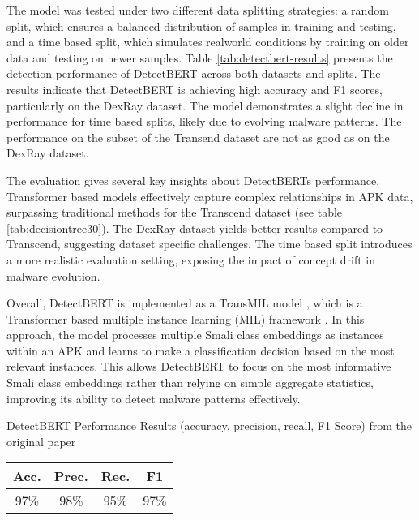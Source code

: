 The model was tested under two different data splitting strategies: a random split, 
which ensures a balanced distribution of samples in training and testing, 
and a time based split, which simulates realworld conditions by training on older 
data and testing on newer samples. 
Table \ref{tab:detectbert-results} presents the detection performance of DetectBERT across both datasets 
and splits. The results indicate that DetectBERT is
achieving high accuracy and F1 scores, particularly on the DexRay dataset. 
The model demonstrates a slight decline in performance for time based splits, 
likely due to evolving malware patterns. 
The performance on the subset of the Transend dataset are not as good as 
on the DexRay dataset.

The evaluation gives several key insights about DetectBERTs performance. 
Transformer based models effectively capture complex relationships in APK data, 
surpassing traditional methods for the Transcend dataset (see table \ref{tab:decisiontree30}). 
The DexRay dataset yields better results compared 
to Transcend, suggesting dataset specific challenges. 
The time based split introduces a more realistic evaluation setting, 
exposing the impact of concept drift in malware evolution.

Overall, DetectBERT is implemented as a TransMIL model , which is a Transformer based 
multiple instance learning (MIL) framework \cite{transmil}. 
In this approach, the model processes 
multiple Smali class embeddings as instances within an APK and learns to make a 
classification decision based on the most relevant instances. This allows DetectBERT 
to focus on the most informative Smali class embeddings rather than relying on 
simple aggregate statistics, improving its ability to detect malware patterns effectively.

\begin{margintable}[-30\baselineskip]
    \caption{\label{tab:detectbert_performance_original} DetectBERT Performance Results (accuracy, precision, recall, F1 Score) from the original paper \cite{detectbert}}
    \footnotesize
    \begin{tabular*}{\linewidth}{@{\extracolsep{\fill}} cccc@{}}
        \toprule
        \textbf{Acc.} & \textbf{Prec.} & \textbf{Rec.} & \textbf{F1} \\
        \midrule
        97\% & 98\% & 95\% & 97\% \\
        \bottomrule
    \end{tabular*}
\end{margintable}




